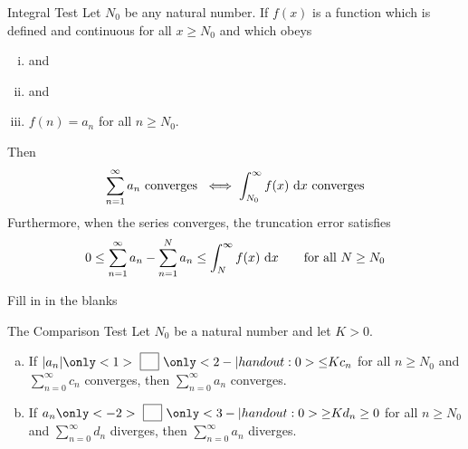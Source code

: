 \begin{frame}[t]
\begin{block}{Integral Test}
Let $N_0$ be any natural number. If $f(x)$ is a function which is defined
and continuous for all $x\ge N_0$ and which obeys
\begin{enumerate}[(i)]
\item {} and
\item  {} and
\item $f(n)=a_n$ for all  $n\ge N_0$.
\end{enumerate}

Then
\hfill{}\begin{equation*}
\sum_{n=1}^\infty a_n\text{ converges }\iff
\int_{N_0}^\infty f(x)\ \text{d}{x}\text{ converges}
\end{equation*}
Furthermore, when the series converges, the truncation error satisfies
\begin{equation*}
0 \le \sum_{n=1}^\infty a_n-\sum_{n=1}^N a_n\le
  \int_N^\infty f(x)\ \text{d}{x}\qquad\text{for all $N\ge N_0$}
\end{equation*}

\end{block}
\end{frame}
\begin{frame}[t]{Fill in in the blanks}
\AnswerSpace
{}
\begin{block}{The Comparison Test}
Let $N_0$ be a natural number and let $K>0$.
\begin{enumerate}[(a)]
\item If $|a_n| \only<1>{~\boxed{\phantom V}~}\only<2-|handout:0>{\leq} K c_n$ for all $n \ge N_0$ and $\sum\limits_{n=0}^\infty c_n$ converges, then $\sum\limits_{n=0}^\infty a_n$ converges.
\item If $a_n \only<-2>{~\boxed{\phantom V}~}\only<3-|handout:0>{\ge} Kd_n \ge 0$ for all $n \ge N_0$ and $\sum\limits_{n=0}^\infty d_n$ diverges, then $\sum\limits_{n=0}^\infty a_n$ diverges.
\end{enumerate}
\end{block}
\end{frame}
